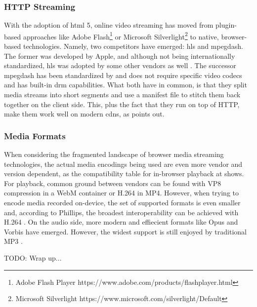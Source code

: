 \subsubsection{HTTP Streaming}
\label{subsec:http-streaming}

With the adoption of \gls{html} 5, online video streaming has moved from plugin-based approaches like Adobe Flash\footnote{Adobe Flash Player https://www.adobe.com/products/flashplayer.html} \cite{adobe-flash} or Microsoft Silverlight\footnote{Microsoft Silverlight https://www.microsoft.com/silverlight/Default} to native, browser-based technologies. Namely, two competitors have emerged: \gls{hls} and \gls{mpegdash}. The former was developed by Apple, and although not being internationally standardized, \gls{hls} was adopted by some other vendors as well \cite{caniuse-hls}. The successor \gls{mpegdash} has been standardized by \citet{iso-mpeg-dash} and does not require specific video codecs and has built-in \gls{drm} capabilities. What both have in common, is that they split media streams into short segments and use a manifest file to stitch them back together on the client side. This, plus the fact that they run on top of HTTP, make them work well on modern \glspl{cdn}, as \cite{hls-vs-dash} points out.

\subsubsection{Media Formats}

When considering the fragmented landscape of browser media streaming technologies, the actual media encodings being used are even more vendor and version dependent, as the compatibility table for in-browser playback at \cite{media-format-browser-compat} shows. For playback, common ground between vendors can be found with VP8 compression in a WebM container or H.264 in MP4. However, when trying to encode media recorded on-device, the set of supported formats is even smaller and, according to Phillips, the broadest interoperability can be achieved with H.264 \cite[\S5.1]{webrtc-hacks-safari}. On the audio side, more modern and effiecient formats like Opus and Vorbis have emerged. However, the widest support is still enjoyed by traditional MP3 \cite{media-format-browser-compat}.

TODO: Wrap up...
